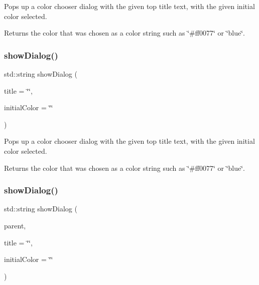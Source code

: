 Pops up a color chooser dialog with the given top title text, with the given initial color selected. 

Returns the color that was chosen as a color string such as \char`\"{}\#ff0077\char`\"{} or \char`\"{}blue\char`\"{}. \mbox{\label{classGColorChooser_ab649c9d45542c25fa22096c5afa831e7}} 
\subsubsection{\texorpdfstring{show\+Dialog()}{showDialog()}\hspace{0.1cm}{\footnotesize\ttfamily [4/6]}}
{\footnotesize\ttfamily std\+::string show\+Dialog (\begin{DoxyParamCaption}\item[{const std\+::string \&}]{title = {\ttfamily \char`\"{}\char`\"{}},  }\item[{const std\+::string \&}]{initial\+Color = {\ttfamily \char`\"{}\char`\"{}} }\end{DoxyParamCaption})\hspace{0.3cm}{\ttfamily [static]}}



Pops up a color chooser dialog with the given top title text, with the given initial color selected. 

Returns the color that was chosen as a color string such as \char`\"{}\#ff0077\char`\"{} or \char`\"{}blue\char`\"{}. \mbox{\label{classGColorChooser_a38b9e47e162e84e985c38c7a8ab69278}} 
\subsubsection{\texorpdfstring{show\+Dialog()}{showDialog()}\hspace{0.1cm}{\footnotesize\ttfamily [5/6]}}
{\footnotesize\ttfamily std\+::string show\+Dialog (\begin{DoxyParamCaption}\item[{\mbox{\hyperlink{classGWindow}{G\+Window}} $\ast$}]{parent,  }\item[{const std\+::string \&}]{title = {\ttfamily \char`\"{}\char`\"{}},  }\item[{const std\+::string \&}]{initial\+Color = {\ttfamily \char`\"{}\char`\"{}} }\end{DoxyParamCaption})\hspace{0.3cm}{\ttfamily [static]}}



